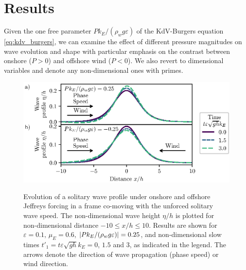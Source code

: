\documentclass{jfm}
\renewcommand*{\epsilon}{\varepsilon}
\begin{document}
\section{\label{sec:results} Results}
Given the one free parameter $P k_E/(\rho_w g \epsilon)$ of the
KdV-Burgers equation \cref{eq:kdv_burgers}, we can examine the effect of
different pressure magnitudes on wave evolution and shape with
particular emphasis on the contrast between onshore ($P > 0$) and
offshore wind ($P < 0$).
We also revert to dimensional variables and denote any
non-dimensional ones with primes.

\begin{figure}
  \centering
  { %
    \label{fig:snapshots_solitary:a}
    \label{fig:snapshots_solitary:b}
  }
  \includegraphics{Snapshots-Positive-Negative-Production.eps}
  \caption{
    Evolution of a solitary wave profile under
    onshore and
    offshore Jeffreys forcing in a frame co-moving with the unforced
    solitary wave speed.
    The non-dimensional wave height $\eta/h$ is plotted for
    non-dimensional distance $-10 \le x/h \le 10$.
    Results are shown for $\epsilon=0.1$, $\mu_E = 0.6$, $\abs{P
    k_E/(\rho_w g \epsilon)} = 0.25$, and non-dimensional slow times
    $t'_1 = t \epsilon \sqrt{gh} k_E = 0$, $1.5$ and $3$, as indicated
    in the legend.
    The arrows denote the direction of wave propagation (phase speed) or
    wind direction.
  }\label{fig:snapshots_solitary}
\end{figure}
\end{document}
